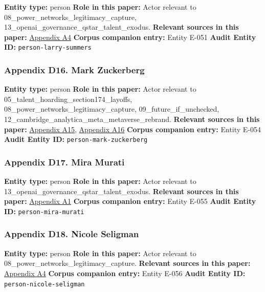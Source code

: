 \documentclass[
  american,
  11pt,
  letterpaper,
]{article}
\begin{document}
\textbf{Entity type:} person \textbf{Role in this paper:} Actor relevant
to 08\_power\_networks\_legitimacy\_capture,
13\_openai\_governance\_qstar\_talent\_exodus. \textbf{Relevant sources
in this paper:}
\hyperref[appendix-a4-openai-announces-new-members-to-board-of-directors]{Appendix
A4} \textbf{Corpus companion entry:} Entity E-051 \textbf{Audit Entity
ID:} \texttt{person-larry-summers}

\subsubsection{Appendix D16. Mark
Zuckerberg}\label{appendix-d16-mark-zuckerberg}

\textbf{Entity type:} person \textbf{Role in this paper:} Actor relevant
to 05\_talent\_hoarding\_section174\_layoffs,
08\_power\_networks\_legitimacy\_capture, 09\_future\_if\_unchecked,
12\_cambridge\_analytica\_meta\_metaverse\_rebrand. \textbf{Relevant
sources in this paper:}
\hyperref[appendix-a15-inside-mark-zuckerbergs-top-secret-hawaii-compound]{Appendix
A15},
\hyperref[appendix-a16-mark-zuckerberg-downplays-his-5-000-square-foot-underground-bunker-in-hawaii-just-a-little-shelter]{Appendix
A16} \textbf{Corpus companion entry:} Entity E-054 \textbf{Audit Entity
ID:} \texttt{person-mark-zuckerberg}

\subsubsection{Appendix D17. Mira
Murati}\label{appendix-d17-mira-murati}

\textbf{Entity type:} person \textbf{Role in this paper:} Actor relevant
to 13\_openai\_governance\_qstar\_talent\_exodus. \textbf{Relevant
sources in this paper:}
\hyperref[appendix-a1-openai-announces-leadership-transition]{Appendix
A1} \textbf{Corpus companion entry:} Entity E-055 \textbf{Audit Entity
ID:} \texttt{person-mira-murati}

\subsubsection{Appendix D18. Nicole
Seligman}\label{appendix-d18-nicole-seligman}

\textbf{Entity type:} person \textbf{Role in this paper:} Actor relevant
to 08\_power\_networks\_legitimacy\_capture. \textbf{Relevant sources in
this paper:}
\hyperref[appendix-a4-openai-announces-new-members-to-board-of-directors]{Appendix
A4} \textbf{Corpus companion entry:} Entity E-056 \textbf{Audit Entity
ID:} \texttt{person-nicole-seligman}
\end{document}
